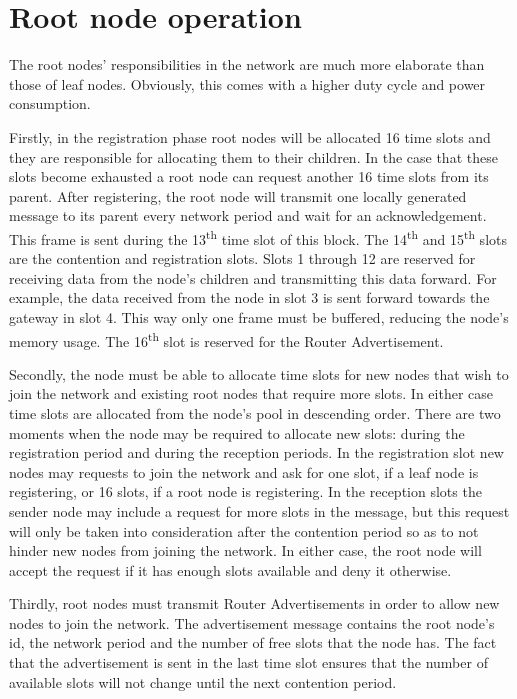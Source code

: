 \section{Root node operation}
\label{sec:root_node_operation}

The root nodes' responsibilities in the network are much more elaborate than
those of leaf nodes. Obviously, this comes with a higher duty cycle and power
consumption. 

Firstly, in the registration phase root nodes will be allocated 16 time slots
and they are responsible for allocating them to their children. In the case
that these slots become exhausted a root node can request another 16 time slots
from its parent. After registering, the root node will transmit one locally
generated message to its parent every network period and wait for an
acknowledgement. This frame is sent during the 13\textsuperscript{th} time slot
of this block. The 14\textsuperscript{th} and 15\textsuperscript{th} slots are
the contention and registration slots. Slots 1 through 12 are reserved for
receiving data from the node's children and transmitting this data forward. For
example, the data received from the node in slot 3 is sent forward towards the
gateway in slot 4. This way only one frame must be buffered, reducing the
node's memory usage. The 16\textsuperscript{th} slot is reserved for the Router
Advertisement.

Secondly, the node must be able to allocate time slots for new nodes that wish
to join the network and existing root nodes that require more slots. In either
case time slots are allocated from the node's pool in descending order. There
are two moments when the node may be required to allocate new slots: during the
registration period and during the reception periods. In the registration slot
new nodes may requests to join the network and ask for one slot, if a leaf node
is registering, or 16 slots, if a root node is registering. In the reception
slots the sender node may include a request for more slots in the message, but
this request will only be taken into consideration after the contention period
so as to not hinder new nodes from joining the network. In either case, the root
node will accept the request if it has enough slots available and deny it
otherwise.  

Thirdly, root nodes must transmit Router Advertisements in order to allow new
nodes to join the network. The advertisement message contains the root node's
id, the network period and the number of free slots that the node has. The fact
that the advertisement is sent in the last time slot ensures that the number of
available slots will not change until the next contention period.

